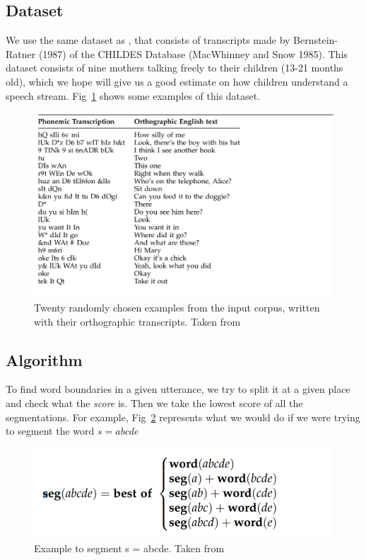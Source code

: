\documentclass{article}
\begin{document}
\subsection{Dataset}
We use the same dataset as \citet{Brent}, that consists of transcripts made by Bernstein-Ratner (1987) of the CHILDES Database (MacWhinney and Snow 1985). This dataset consists of nine mothers talking freely to their children (13-21 months old), which we hope will give us a good estimate on how children understand a speech stream. Fig~\ref{fig:fig7} shows some examples of this dataset.
\begin{figure}[h!]
    \centering
    \includegraphics[scale=0.8]{figures/venkataram_corpus_example.PNG}
    \caption{Twenty randomly chosen examples from the input corpus, written with their orthographic transcripts. Taken from \citet{Venkataraman}}
    \label{fig:fig7}
\end{figure}
\subsection{Algorithm}
To find word boundaries in a given utterance, we try to split it at a given place and check what the \textit{score} is. Then we take the lowest score of all the segmentations.  For example, Fig~\ref{fig:fig8} represents what we would do if we were trying to segment the word $s = abcde$

\begin{figure}[h]
    \centering
    \includegraphics[scale=0.8]{figures/venkataram_seg_example.PNG}
    \caption{Example to segment s = abcde. Taken from \citet{Venkataraman}}
    \label{fig:fig8}
\end{figure}
\end{document}
